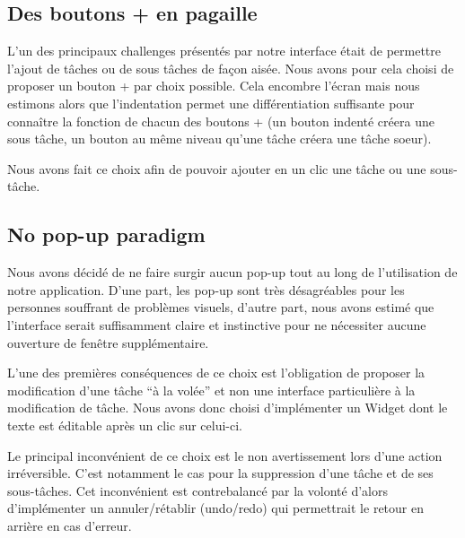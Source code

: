 \documentclass[11pt]{article}
\begin{document}


\subsection{Des boutons + en pagaille}

L'un des principaux challenges présentés par notre interface était de
permettre l'ajout de tâches ou de sous tâches de façon aisée. Nous
avons pour cela choisi de proposer un bouton + par choix
possible. Cela encombre l'écran mais nous estimons alors que
l'indentation permet une différentiation suffisante pour connaître la
fonction de chacun des boutons + (un bouton indenté créera une sous
tâche, un bouton au même niveau qu'une tâche créera une tâche soeur).

Nous avons fait ce choix afin de pouvoir ajouter en un clic une tâche
ou une sous-tâche.




\subsection{No pop-up paradigm}

Nous avons décidé de ne faire surgir aucun pop-up tout au long de
l'utilisation de notre application. D'une part, les pop-up sont très
désagréables pour les personnes souffrant de problèmes visuels,
d'autre part, nous avons estimé que l'interface serait suffisamment
claire et instinctive pour ne nécessiter aucune ouverture de fenêtre
supplémentaire.

L'une des premières conséquences de ce choix est l'obligation de
proposer la modification d'une tâche ``à la volée'' et non une
interface particulière à la modification de tâche. Nous avons donc
choisi d'implémenter un Widget dont le texte est éditable après un
clic sur celui-ci.

Le principal inconvénient de ce choix est le non avertissement lors
d'une action irréversible. C'est notamment le cas pour la suppression
d'une tâche et de ses sous-tâches. Cet inconvénient est contrebalancé
par la volonté d'alors d'implémenter un annuler/rétablir (undo/redo)
qui permettrait le retour en arrière en cas d'erreur.
\end{document}
